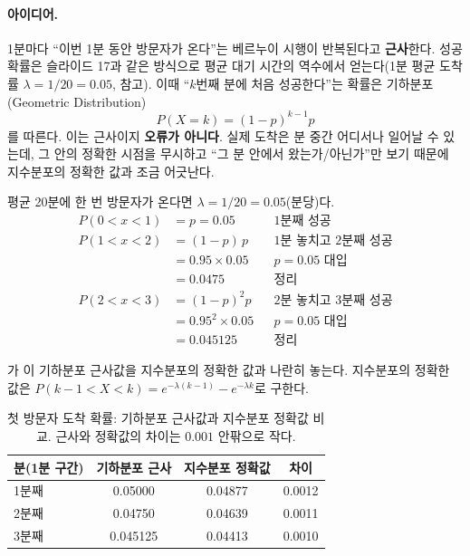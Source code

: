 \paragraph{아이디어.} 1분마다 ``이번 1분 동안 방문자가 온다''는 베르누이
시행이 반복된다고 \textbf{근사}한다. 성공 확률은 슬라이드 17과 같은 방식으로
평균 대기 시간의 역수에서 얻는다(1분 평균 도착률 $\lambda = 1/20 = 0.05$,
 참고). 이때 ``$k$번째 분에 처음 성공한다''는 확률은
기하분포(Geometric Distribution)
\[
  P(X=k) = (1-p)^{k-1} p
\]
를 따른다. 이는 근사이지 \textbf{오류가 아니다}. 실제 도착은 분 중간
어디서나 일어날 수 있는데, 그 안의 정확한 시점을 무시하고 ``그 분 안에서
왔는가/아닌가''만 보기 때문에 지수분포의 정확한 값과 조금 어긋난다.

\begin{example}
\label{ex:dist-website}
평균 20분에 한 번 방문자가 온다면 $\lambda = 1/20 = 0.05$(분당)다.
\begin{align*}
  P(0<x<1) &= p = \mathbf{0.05}          && \text{1분째 성공}\\
  P(1<x<2) &= (1-p)\,p                    && \text{1분 놓치고 2분째 성공}\\
           &= 0.95\times 0.05             && \text{$p=0.05$ 대입}\\
           &= \mathbf{0.0475}              && \text{정리}\\
  P(2<x<3) &= (1-p)^2 p                   && \text{2분 놓치고 3분째 성공}\\
           &= 0.95^2\times 0.05           && \text{$p=0.05$ 대입}\\
           &= \mathbf{0.045125}            && \text{정리}
\end{align*}
\end{example}

가 이 기하분포 근사값을 지수분포의 정확한 값과
나란히 놓는다. 지수분포의 정확한 값은
$P(k-1<X<k) = e^{-\lambda(k-1)} - e^{-\lambda k}$로 구한다.

\begin{table}[H]\centering
\begin{tabularx}{\linewidth}{@{}X c c c@{}}
\toprule
분(1분 구간) & 기하분포 근사 & 지수분포 정확값 & 차이 \\
\midrule
1분째 & 0.05000 & 0.04877 & 0.0012 \\
\midrule
2분째 & 0.04750 & 0.04639 & 0.0011 \\
\midrule
3분째 & 0.045125 & 0.04413 & 0.0010 \\
\bottomrule
\end{tabularx}
\caption{첫 방문자 도착 확률: 기하분포 근사값과 지수분포 정확값 비교.
근사와 정확값의 차이는 $0.001$ 안팎으로 작다.}
\label{tab:dist-geometric}
\end{table}

